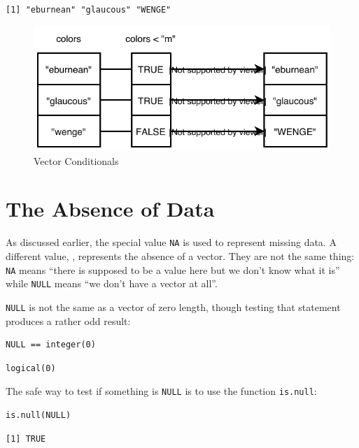 \begin{lstlisting}
[1] "eburnean" "glaucous" "WENGE"   
\end{lstlisting}

\begin{figure}[h]
  \includegraphics{figures/basics/if-else.pdf}
  \caption{Vector Conditionals}
  \label{fig:ifelse-fig}
\end{figure}

\section{The Absence of Data}

As discussed earlier,
the special value \texttt{NA} is used to represent missing data.
A different value,
,
represents the absence of a vector.
They are not the same thing:
\texttt{NA} means
``there is supposed to be a value here but we don't know what it is''
while \texttt{NULL} means
``we don't have a vector at all''.

\texttt{NULL} is not the same as a vector of zero length,
though testing that statement produces a rather odd result:

\begin{lstlisting}
NULL == integer(0)
\end{lstlisting}

\begin{lstlisting}
logical(0)
\end{lstlisting}

The safe way to test if something is \texttt{NULL} is to use the function \texttt{is.null}:

\begin{lstlisting}
is.null(NULL)
\end{lstlisting}

\begin{lstlisting}
[1] TRUE
\end{lstlisting}

